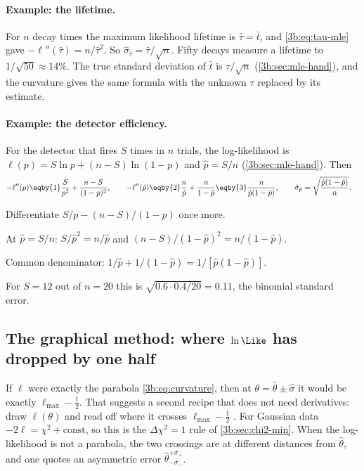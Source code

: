 \paragraph{Example: the lifetime.}
For $n$ decay times the maximum likelihood lifetime is $\hat\tau=\bar t$,
and \eqref{3b:eq:tau-mle} gave $-\ell''(\hat\tau)=n/\hat\tau^2$. So
$\hat\sigma_{\hat\tau}=\hat\tau/\sqrt n$. Fifty decays measure a lifetime to
$1/\sqrt{50}\approx14\%$. The true standard deviation of $\bar t$ is
$\tau/\sqrt n$ (\cref{3b:sec:mle-hand}), and the curvature gives the same
formula with the unknown $\tau$ replaced by its estimate.

\paragraph{Example: the detector efficiency.}
For the detector that fires $S$ times in $n$ trials, the log-likelihood is
$\ell(p)=S\ln p+(n-S)\ln(1-p)$ and $\hat p=S/n$ (\cref{3b:sec:mle-hand}).
Then
\begin{align*}
  -\ell''(p)&\eqby{1}\frac{S}{p^2}+\frac{n-S}{(1-p)^2},\qquad
  -\ell''(\hat p)\eqby{2}\frac{n}{\hat p}+\frac{n}{1-\hat p}
  \eqby{3}\frac{n}{\hat p(1-\hat p)},\qquad
  \hat\sigma_{\hat p}=\sqrt{\frac{\hat p(1-\hat p)}{n}} .
\end{align*}
\begin{explain}
  \item Differentiate $S/p-(n-S)/(1-p)$ once more.
  \item At $\hat p=S/n$: $S/\hat p^2=n/\hat p$ and
        $(n-S)/(1-\hat p)^2=n/(1-\hat p)$.
  \item Common denominator: $1/\hat p+1/(1-\hat p)=1/[\hat p(1-\hat p)]$.
\end{explain}
For $S=12$ out of $n=20$ this is $\sqrt{0.6\cdot0.4/20}=0.11$, the
binomial standard error.

\subsection{The graphical method: where \texorpdfstring{$\ln\Like$}{ln L} has dropped by one half}
\label{3b:sec:delta-lnl}

If $\ell$ were exactly the parabola \eqref{3b:eq:curvature}, then at
$\theta=\hat\theta\pm\hat\sigma$ it would be exactly $\ell_{\max}-\tfrac12$.
That suggests a second recipe that does not need derivatives: draw
$\ell(\theta)$ and read off where it crosses $\ell_{\max}-\tfrac12$
. For Gaussian data $-2\ell=\chi^2+\text{const}$, so
this is the $\Delta\chi^2=1$ rule of \cref{3b:sec:chi2-min}. When the
log-likelihood is not a parabola, the two crossings are at different
distances from $\hat\theta$, and one quotes an asymmetric error
$\hat\theta^{+\sigma_+}_{-\sigma_-}$.

